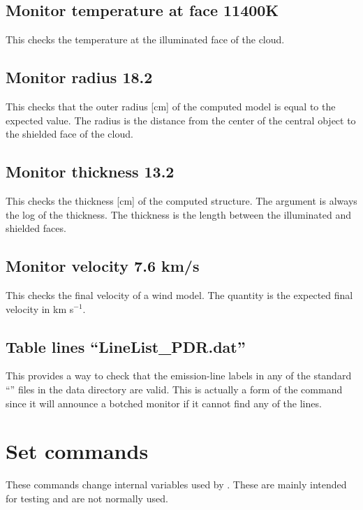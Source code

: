 \subsection{Monitor temperature at face 11400K}

This checks the temperature at the illuminated face of the cloud.

\subsection{Monitor radius 18.2}

This checks that the outer radius [cm] of the computed model is equal
to the expected value.
The radius is the distance from the center of the
central object to the shielded face of the cloud.

\subsection{Monitor thickness 13.2}

This checks the thickness [cm] of the computed structure.
The argument
is always the log of the thickness.
The thickness is the length between
the illuminated and shielded faces.

\subsection{Monitor velocity 7.6 km/s}

This checks the final velocity of a wind model.
The quantity is the
expected final velocity in km s$^{-1}$.

\subsection{Table lines ``LineList\_PDR.dat''}

This provides a way to check that the emission-line labels in any of
the standard ``'' files
in the data directory are valid.
This
is actually a form of the  command since
it will announce a botched monitor
if it cannot find any of the lines.

\section{Set commands}

These commands change internal variables used by \Cloudy.
These are mainly
intended for testing and are not normally used.

